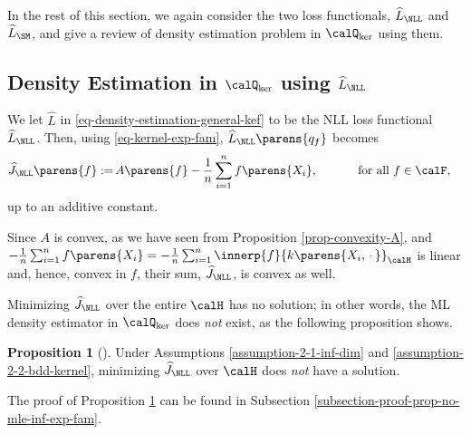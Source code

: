 \documentclass[12pt]{article}
\theoremstyle{definition}
\theoremstyle{theorem}
\newtheorem{proposition}{Proposition}
\theoremstyle{remark}
\begin{document}
In the rest of this section, we again consider the two loss functionals, $\widehat{L}_{\NLL}$ and $\widehat{L}_{\SM}$, and give a review of density estimation problem in $\calQ_{\ker}$ using them. 

\subsection{Density Estimation in $\calQ_{\ker}$ using $\widehat{L}_{\NLL}$}\label{subsection-nnl-kef}

We let $\widehat{L}$ in \eqref{eq-density-estimation-general-kef} to be the NLL loss functional $\widehat{L}_{\NLL}$. Then, using \eqref{eq-kernel-exp-fam}, $\widehat{L}_{\NLL} \parens{q_f}$ becomes 
\begin{align}
	\widehat{J}_{\NLL} \parens{f} %
	:= & \, A \parens{f} - \frac{1}{n} \sum_{i=1}^n f \parens{X_i}, \qquad \quad \text{ for all } f \in \calF, 
\end{align}
up to an additive constant. 

Since $A$ is convex, as we have seen from Proposition \ref{prop-convexity-A}, and $- \frac{1}{n} \sum_{i=1}^n f \parens{X_i} = - \frac{1}{n} \sum_{i=1}^n \innerp{f}{k \parens{X_i, \,\cdot\,}}_{\calH}$ is linear and, hence, convex in $f$, their sum, $\widehat{J}_{\NLL}$, is convex as well. 

Minimizing $\widehat{J}_{\NLL}$ over the entire $\calH$ has no solution; in other words, the ML density estimator in $\calQ_{\ker}$ does \emph{not} exist, as the following proposition shows. 

\begin{proposition}[\textcites{Fukumizu2005-mf}]\label{prop-no-mle-inf-exp-fam}
	Under Assumptions \ref{assumption-2-1-inf-dim} and \ref{assumption-2-2-bdd-kernel}, minimizing $\widehat{J}_{\NLL}$ over $\calH$ does \emph{not} have a solution. 
\end{proposition}

The proof of Proposition \ref{prop-no-mle-inf-exp-fam} can be found in Subsection \ref{subsection-proof-prop-no-mle-inf-exp-fam}. 
\end{document}
